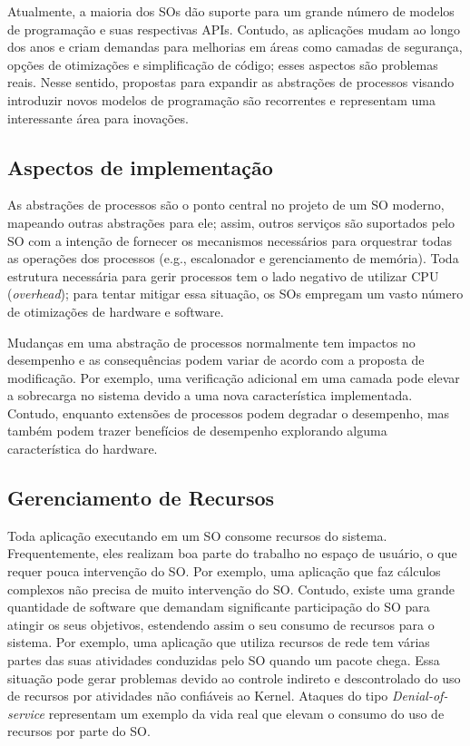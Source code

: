 Atualmente, a maioria dos SOs dão suporte para um grande número de modelos de
programação e suas respectivas APIs. Contudo, as aplicações mudam ao longo dos
anos e criam demandas para melhorias em áreas como camadas de segurança, opções
de otimizações e simplificação de código; esses aspectos são problemas reais.
Nesse sentido, propostas para expandir as abstrações de processos visando
introduzir novos modelos de programação são recorrentes e representam uma
interessante área para inovações.

\subsection{Aspectos de implementação}

As abstrações de processos são o ponto central no projeto de um SO moderno,
mapeando outras abstrações para ele; assim, outros serviços são suportados pelo
SO com a intenção de fornecer os mecanismos necessários para orquestrar todas
as operações dos processos (e.g., escalonador e gerenciamento de memória). Toda
estrutura necessária para gerir processos tem o lado negativo de utilizar CPU
(\emph{overhead}); para tentar mitigar essa situação, os SOs empregam um vasto
número de otimizações de hardware e software.

Mudanças em uma abstração de processos normalmente tem impactos no desempenho e
as consequências podem variar de acordo com a proposta de modificação. Por
exemplo, uma verificação adicional em uma camada pode elevar a sobrecarga no
sistema devido a uma nova característica implementada. Contudo, enquanto
extensões de processos podem degradar o desempenho, mas também podem trazer
benefícios de desempenho explorando alguma característica do hardware.

\subsection{Gerenciamento de Recursos}

Toda aplicação executando em um SO consome recursos do sistema. Frequentemente,
eles realizam boa parte do trabalho no espaço de usuário, o que requer pouca
intervenção do SO. Por exemplo, uma aplicação que faz cálculos complexos não
precisa de muito intervenção do SO. Contudo, existe uma grande quantidade de
software que demandam significante participação do SO para atingir os seus
objetivos, estendendo assim o seu consumo de recursos para o sistema. Por
exemplo, uma aplicação que utiliza recursos de rede tem várias partes das suas
atividades conduzidas pelo SO quando um pacote chega. Essa situação pode gerar
problemas devido ao controle indireto e descontrolado do uso de recursos por
atividades não confiáveis ao Kernel. Ataques do tipo \emph{Denial-of-service}
representam um exemplo da vida real que elevam o consumo do uso de recursos por
parte do SO.

